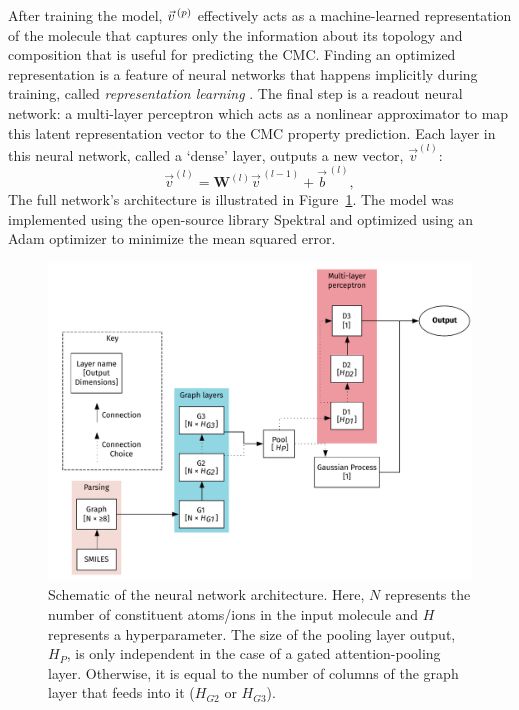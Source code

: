 After training the model, $\vec{v}^{\,(p)}{}$ effectively acts as a machine-learned
representation of the molecule that captures only the information about its
topology and composition that is useful for predicting the CMC. Finding an
optimized representation is a feature of neural networks that happens implicitly
during training, called \emph{representation learning}
\cite{goodfellowRepresentationLearning2016}. The final step is a readout neural
network: a multi-layer perceptron which acts as a nonlinear approximator to map
this latent representation vector to the CMC property prediction. Each layer in
this neural network, called a `dense' layer, outputs a new vector,
$\vec{v}^{(l)}$:
\begin{equation}
    \vec{v}^{(l)} = \mathbf{W}^{(l)}\vec{v}^{\,(l-1)} + \vec{b}^{\,(l)},
\end{equation}
The full network's architecture is illustrated in
Figure~\ref{fig:model-topology}. The model was implemented using the open-source
library Spektral\cite{grattarolaGraphNeuralNetworks2020} and optimized using an
Adam optimizer \cite{kingmaAdamMethodStochastic2017} to minimize the mean
squared error.

\begin{figure}
    \centering
    \includegraphics[width=\textwidth]{images/model_graph.pdf}
    \caption{Schematic of the neural network architecture. Here, $N$ represents
        the number of constituent atoms/ions in the input molecule and $H$
        represents a hyperparameter. The size of the pooling layer output, $H_P$, is
        only independent in the case of a gated attention-pooling layer. Otherwise,
        it is equal to the number of columns of the graph layer that feeds into it
        ($H_{G2}$ or $H_{G3}$).}
    \label{fig:model-topology}
\end{figure}

